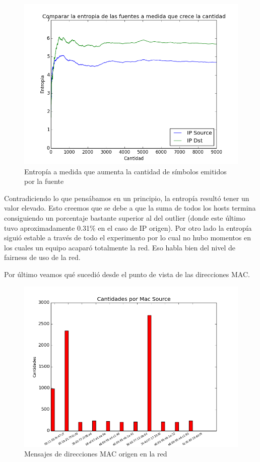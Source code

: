 \begin{figure}[h!]
\centering
\includegraphics[width=0.7\linewidth]{imagenes/exp2/8entropiaIPDstyIPSource}
\caption{Entrop\'ia a medida que aumenta la cantidad de s\'imbolos emitidos por la fuente}
\label{exp1grafico1}
\end{figure}

Contradiciendo lo que pens\'abamos en un principio, la entrop\'ia result\'o tener un valor elevado. Esto creemos que se debe a que la suma de todos los hosts termina consiguiendo un porcentaje bastante superior al del outlier (donde este \'ultimo tuvo aproximadamente 0.31\% en el caso de IP origen). Por otro lado la entrop\'ia sigui\'o estable a trav\'es de todo el experimento por lo cual no hubo momentos en los cuales un equipo acapar\'o totalmente la red. Eso habla bien del nivel de fairness de uso de la red.\newpage

Por \'ultimo veamos qu\'e sucedi\'o desde el punto de vista de las direcciones MAC.

\begin{figure}[h!]
\centering
\includegraphics[width=0.7\linewidth]{imagenes/exp2/9v2CantidadesMacSource100}
\caption{Mensajes de direcciones MAC origen en la red}
\label{exp1grafico1}
\end{figure}

